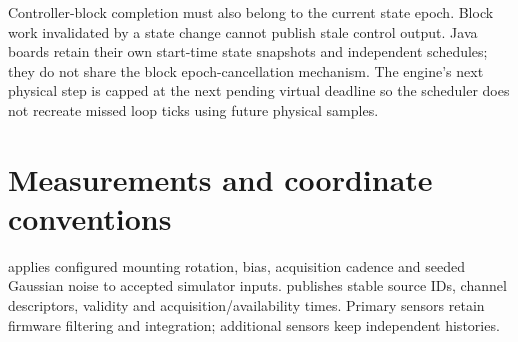 Controller-block completion must also belong to the current state epoch. Block work invalidated
by a state change cannot publish stale control output. Java boards retain their own start-time state snapshots and independent schedules; they do not share the block epoch-cancellation mechanism. The engine's next
physical step is capped at the next pending virtual deadline so the scheduler
does not recreate missed loop ticks using future physical samples.

\clearpage
\section{Measurements and coordinate conventions}
 applies configured mounting rotation, bias,
acquisition cadence and seeded Gaussian noise to accepted simulator inputs.
 publishes stable source IDs, channel descriptors,
validity and acquisition/availability times. Primary sensors retain firmware
filtering and integration; additional sensors keep independent histories.


